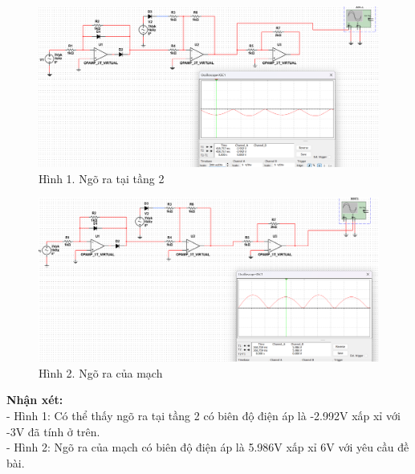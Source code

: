\begin{figure}[H]
	\centering
	\includegraphics[scale=0.45]{image/C14_vo2.png}
    \caption*{Hình 1. Ngõ ra tại tầng 2}
\end{figure}
\begin{figure}[H]
	\centering
	\includegraphics[scale=0.45]{image/C14.png}
    \caption*{Hình 2. Ngõ ra của mạch}
\end{figure}
\textbf{Nhận xét:}\\
- Hình 1: Có thể thấy ngõ ra tại tầng 2 có biên độ điện áp là -2.992V xấp xỉ với -3V đã tính ở trên.\\
- Hình 2: Ngõ ra của mạch có biên độ điện áp là 5.986V xấp xỉ 6V với yêu cầu đề bài.
